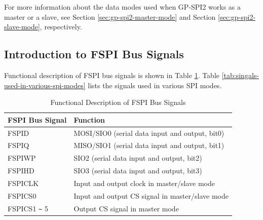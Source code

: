 \documentclass[main\_\_EN.tex]{subfiles}
\begin{document}
For more information about the data modes used when GP-SPI2 works as a master or a slave, see Section \ref{sec:gp-spi2-master-mode} and Section \ref{sec:gp-spi2-slave-mode}, respectively. 

\subsection{Introduction to FSPI Bus Signals}
Functional description of FSPI bus signals is shown in Table \ref{table:SPI_signals}. Table \ref{tab:singals-used-in-various-spi-modes} lists the signals used in various SPI modes. 


\begin{ThreePartTable}

\begin{TableNotes}
\end{TableNotes}

\begin{longtable}[c]{|l|l|}
\caption{Functional Description of FSPI Bus Signals}
\label{table:SPI_signals}\\
\hline
    \rowcolor{lightgray}
    \textbf{FSPI Bus Signal}& \textbf{Function} \\
    \hline
    \endfirsthead
    \endlastfoot
    FSPID & MOSI/SIO0 (serial data input and output, bit0)\\
    \hline
    FSPIQ & MISO/SIO1 (serial data input and output, bit1) \\\hline
    FSPIWP & SIO2 (serial data input and output, bit2) \\\hline
    FSPIHD & SIO3 (serial data input and output, bit3) \\\hline
    FSPICLK & Input and output clock in master/slave mode \\\hline
    FSPICS0 & Input and output CS signal in master/slave mode \\\hline
    FSPICS1 \verb+~+ 5 & Output CS signal in master mode\\\hline
\end{longtable}

\end{ThreePartTable}
\end{document}
